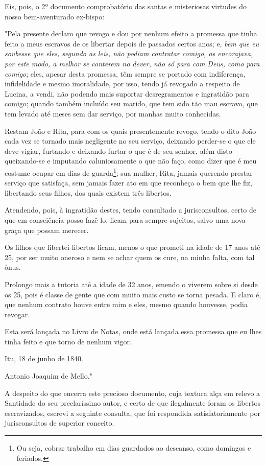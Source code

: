 Eis, pois, o 2º documento comprobatório das santas e misteriosas
virtudes do nosso bem-aventurado ex-bispo:

"Pela presente declaro que revogo e dou por nenhum efeito a promessa que
tinha feito a meus escravos de os libertar depois de passados certos
anos; e, \emph{bem que eu soubesse que eles, segundo as leis, não podiam
contratar comigo, os encorajava, por este modo, a melhor se conterem no
dever, não só para com Deus, como para comigo}; eles, apesar desta
promessa, têm sempre se portado com indiferença, infidelidade e mesmo
imoralidade, por isso, tendo já revogado a respeito de Lucina, a vendi,
não podendo mais suportar desregramentos e ingratidão para comigo;
quando também incluído seu marido, que tem sido tão mau escravo, que tem
levado até meses sem dar serviço, por manhas muito conhecidas.

Restam João e Rita, para com os quais presentemente revogo, tendo o dito
João cada vez se tornado mais negligente no seu serviço, deixando
perder-se o que ele deve vigiar, furtando e deixando furtar o que é de
seu senhor, além disto queixando-se e imputando caluniosamente o que não
faço, como dizer que é meu costume ocupar em dias de guarda\footnote{
  Ou seja, cobrar trabalho em dias guardados ao descanso, como domingos
  e feriados.}; sua mulher, Rita, jamais querendo prestar serviço que
satisfaça, sem jamais fazer ato em que reconheça o bem que lhe fiz,
libertando seus filhos, dos quais existem três libertos.

Atendendo, pois, à ingratidão destes, tendo consultado a jurisconsultos,
certo de que em consciência posso fazê-lo, ficam para sempre sujeitos,
salvo uma nova graça que possam merecer.

Os filhos que libertei libertos ficam, menos o que prometi na idade de
17 anos até 25, por ser muito oneroso e nem se achar quem os cure, na
minha falta, com tal ônus.

Prolongo mais a tutoria até a idade de 32 anos, emendo o viverem sobre
si desde os 25, pois é classe de gente que com muito mais custo se torna
pesada. E claro é, que nenhum contrato houve entre mim e eles, mesmo
quando houvesse, podia revogar.

Esta será lançada no Livro de Notas, onde está lançada essa promessa que
eu lhes tinha feito e que torno de nenhum vigor.

Itu, 18 de junho de 1840.

Antonio Joaquim de Mello."

A despeito do que encerra este precioso documento, cuja textura alça em
relevo a Santidade do seu preclaríssimo autor, e certo de que
ilegalmente foram os libertos escravizados, escrevi a seguinte consulta,
que foi respondida satisfatoriamente por jurisconsultos de superior
conceito.

